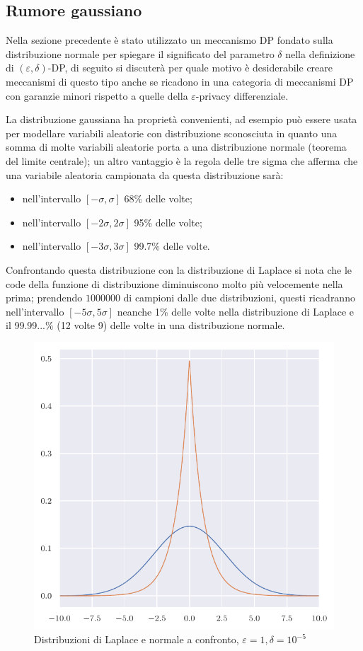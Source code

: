 \subsection{Rumore gaussiano}

Nella sezione precedente è stato utilizzato un meccanismo DP fondato sulla distribuzione normale per spiegare il significato del parametro $\delta$ nella definizione di $(\varepsilon, \delta)$-DP, di seguito si discuterà per quale motivo è desiderabile creare meccanismi di questo tipo anche se ricadono in una categoria di meccanismi DP con garanzie minori rispetto a quelle della $\varepsilon$-privacy differenziale.

La distribuzione gaussiana ha proprietà convenienti, ad esempio può essere usata per modellare variabili aleatorie con distribuzione sconosciuta in quanto una somma di molte variabili aleatorie porta a una distribuzione normale (teorema del limite centrale); un altro vantaggio è la regola delle tre sigma \cite{Kazmier_2003} che afferma che una variabile aleatoria campionata da questa distribuzione sarà:
\begin{itemize}
    \item nell'intervallo $[-\sigma, \sigma]$ 68\% delle volte;
    \item nell'intervallo $[-2\sigma, 2\sigma]$ 95\% delle volte;
    \item nell'intervallo $[-3\sigma, 3\sigma]$ 99.7\% delle volte.
\end{itemize}

Confrontando questa distribuzione con la distribuzione di Laplace si nota che le code della funzione di distribuzione diminuiscono molto più velocemente nella prima; prendendo $1000000$ di campioni dalle due distribuzioni, questi ricadranno nell'intervallo $[-5\sigma, 5\sigma]$ neanche 1\% delle volte nella distribuzione di Laplace e il 99.99...\% (12 volte 9) delle volte in una distribuzione normale.


\begin{figure}[H]
    \centering
    \includegraphics[width=.5\linewidth]{plots/gauss_laplace_e_1.pdf}
    \caption{Distribuzioni di Laplace e normale a confronto, $\varepsilon = 1, \delta = 10^{-5}$}
    \label{plot:normalized_inv_plrv}
\end{figure}


